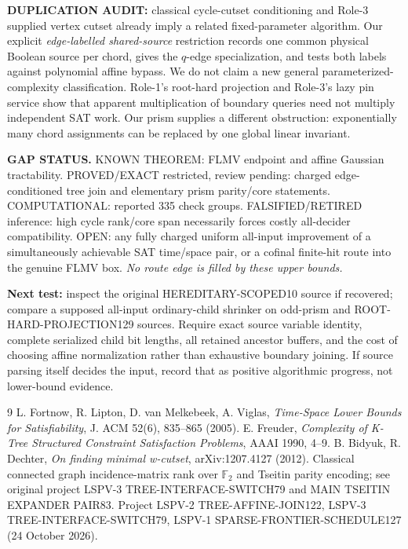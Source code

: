 \documentclass[11pt]{article}
\begin{document}
\textbf{DUPLICATION AUDIT:} classical cycle-cutset conditioning and Role-3 supplied vertex cutset already imply a related fixed-parameter algorithm. Our explicit \emph{edge-labelled shared-source} restriction records one common physical Boolean source per chord, gives the $q$-edge specialization, and tests both labels against polynomial affine bypass. We do not claim a new general parameterized-complexity classification. Role-1's root-hard projection and Role-3's lazy pin service show that apparent multiplication of boundary queries need not multiply independent SAT work. Our prism supplies a different obstruction: exponentially many chord assignments can be replaced by one global linear invariant.

\textbf{GAP STATUS.} KNOWN THEOREM: FLMV endpoint and affine Gaussian tractability. PROVED/EXACT restricted, review pending: charged edge-conditioned tree join and elementary prism parity/core statements. COMPUTATIONAL: reported 335 check groups. FALSIFIED/RETIRED inference: high cycle rank/core span necessarily forces costly all-decider compatibility. OPEN: any fully charged uniform all-input improvement of a simultaneously achievable SAT time/space pair, or a cofinal finite-hit route into the genuine FLMV box. \emph{No route edge is filled by these upper bounds.}

\textbf{Next test:} inspect the original HEREDITARY-SCOPED10 source if recovered; compare a supposed all-input ordinary-child shrinker on odd-prism and ROOT-HARD-PROJECTION129 sources. Require exact source variable identity, complete serialized child bit lengths, all retained ancestor buffers, and the cost of choosing affine normalization rather than exhaustive boundary joining. If source parsing itself decides the input, record that as positive algorithmic progress, not lower-bound evidence.

\begin{thebibliography}{9}
 L. Fortnow, R. Lipton, D. van Melkebeek, A. Viglas, \emph{Time-Space Lower Bounds for Satisfiability}, J. ACM 52(6), 835--865 (2005).
 E. Freuder, \emph{Complexity of K-Tree Structured Constraint Satisfaction Problems}, AAAI 1990, 4--9.
 B. Bidyuk, R. Dechter, \emph{On finding minimal w-cutset}, arXiv:1207.4127 (2012).
 Classical connected graph incidence-matrix rank over $\mathbb F_2$ and Tseitin parity encoding; see original project LSPV-3 TREE-INTERFACE-SWITCH79 and MAIN TSEITIN EXPANDER PAIR83.
 Project LSPV-2 TREE-AFFINE-JOIN122, LSPV-3 TREE-INTERFACE-SWITCH79, LSPV-1 SPARSE-FRONTIER-SCHEDULE127 (24 October 2026).
\end{thebibliography}
\end{document}
